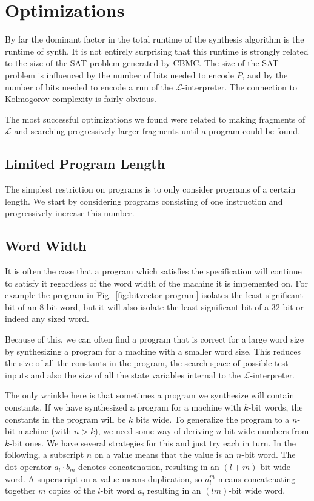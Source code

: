 \documentclass[a4paper]{llncs}
\begin{document}
\section{Optimizations}

By far the dominant factor in the total runtime of the synthesis algorithm is
the runtime of {\sc synth}.  It is not entirely surprising that this runtime
is strongly related to the size of the SAT problem generated by CBMC.  The size
of the SAT problem is influenced by the number of bits needed to encode $P$,
and by the number of bits needed to encode a run of the $\mathcal{L}$-interpreter.
The connection to Kolmogorov complexity is fairly obvious.

The most successful optimizations we found were related to making fragments of
$\mathcal{L}$ and searching progressively larger fragments until a program
could be found.

\subsection{Limited Program Length}
The simplest restriction on programs is to only consider programs of a certain length.
We start by considering programs consisting of one instruction and progressively
increase this number.

\subsection{Word Width}
It is often the case that a program which satisfies the specification
will continue to satisfy it regardless of the word width of the machine it is
impemented on.  For example the program in Fig.~\ref{fig:bitvector-program}
isolates the least significant bit of an 8-bit word, but it will also
isolate the least significant bit of a 32-bit or indeed any sized word.

Because of this, we can often find a program that is correct for a large
word size by synthesizing a program for a machine with a smaller word size.
This reduces the size of all the constants in the program, the search space
of possible test inputs and also the size of all the state variables internal
to the $\mathcal{L}$-interpreter.

The only wrinkle here is that sometimes a program we synthesize will contain
constants.  If we have synthesized a program for a machine with $k$-bit words,
the constants in the program will be $k$ bits wide.  To generalize the program
to a $n$-bit machine (with $n > k$), we need some way of deriving $n$-bit
wide numbers from $k$-bit ones.  We have several strategies for this and
just try each in turn.  In the following, a subscript $n$ on a value means that
the value is an $n$-bit word.  The dot operator $a_l \cdot b_m$ denotes
concatenation, resulting in an $(l+m)$-bit wide word.  A superscript on a value
means duplication, so $a_l^m$ means concatenating together $m$ copies of the $l$-bit
word $a$, resulting in an $(lm)$-bit wide word.
\end{document}
